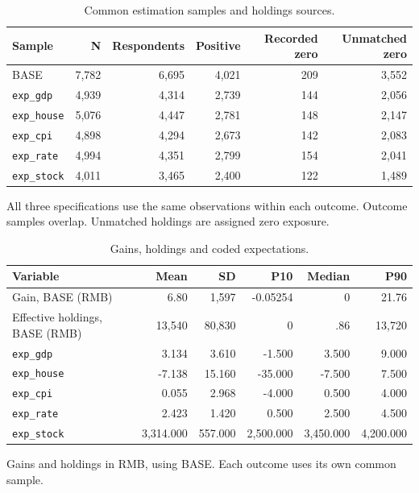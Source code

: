\documentclass[11pt,letterpaper,english,final]{article}
\begin{document}
\begin{table}[H]
\centering\small
\setlength{\tabcolsep}{5pt}
\caption{Common estimation samples and holdings sources.}
\begin{tabular}{lrrrrr}
\toprule
Sample & N & Respondents & Positive & Recorded zero & Unmatched zero \\
\midrule
BASE & 7,782 & 6,695 & 4,021 & 209 & 3,552 \\
\texttt{exp\_gdp} & 4,939 & 4,314 & 2,739 & 144 & 2,056 \\
\texttt{exp\_house} & 5,076 & 4,447 & 2,781 & 148 & 2,147 \\
\texttt{exp\_cpi} & 4,898 & 4,294 & 2,673 & 142 & 2,083 \\
\texttt{exp\_rate} & 4,994 & 4,351 & 2,799 & 154 & 2,041 \\
\texttt{exp\_stock} & 4,011 & 3,465 & 2,400 & 122 & 1,489 \\
\bottomrule
\end{tabular}
\par\vspace{4pt}\begin{minipage}{\linewidth}\footnotesize All three specifications use the same observations within each outcome. Outcome samples overlap. Unmatched holdings are assigned zero exposure.\end{minipage}
\end{table}

\begin{table}[H]
\centering\small
\setlength{\tabcolsep}{5pt}
\caption{Gains, holdings and coded expectations.}
\begin{tabular}{lrrrrr}
\toprule
Variable & Mean & SD & P10 & Median & P90 \\
\midrule
Gain, BASE (RMB) & 6.80 & 1,597 & -0.05254 & 0 & 21.76 \\
Effective holdings, BASE (RMB) & 13,540 & 80,830 & 0 & .86 & 13,720 \\
\texttt{exp\_gdp} & 3.134 & 3.610 & -1.500 & 3.500 & 9.000 \\
\texttt{exp\_house} & -7.138 & 15.160 & -35.000 & -7.500 & 7.500 \\
\texttt{exp\_cpi} & 0.055 & 2.968 & -4.000 & 0.500 & 4.000 \\
\texttt{exp\_rate} & 2.423 & 1.420 & 0.500 & 2.500 & 4.500 \\
\texttt{exp\_stock} & 3,314.000 & 557.000 & 2,500.000 & 3,450.000 & 4,200.000 \\
\bottomrule
\end{tabular}
\par\vspace{4pt}\begin{minipage}{\linewidth}\footnotesize Gains and holdings in RMB, using BASE. Each outcome uses its own common sample.\end{minipage}
\end{table}
\end{document}
